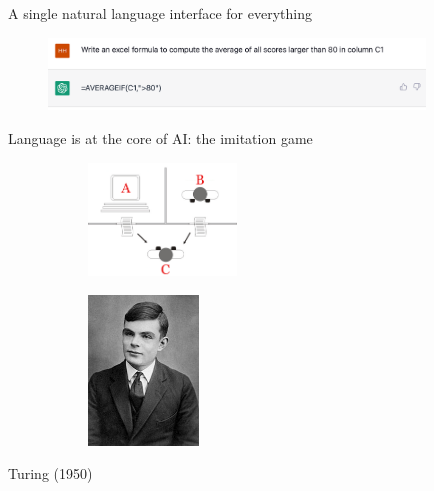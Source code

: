 \documentclass[usenames,dvipsnames,notes,11pt,aspectratio=169]{beamer}
\newcommand{\pdfnote}[1]{}
\begin{document}
\begin{frame}
    {A single natural language interface for everything}
    \begin{figure}
        \includegraphics[width=10cm]{figures/chatgpt-2}
    \end{figure}
\end{frame}

\begin{frame}
    {Language is at the core of AI: the imitation game}
    \begin{figure}
        \begin{subfigure}[b]{0.4\textwidth}
        \includegraphics[height=3cm]{figures/turing-test}
        \end{subfigure}\hfill
        \begin{subfigure}[b]{0.4\textwidth}
        \includegraphics[height=4cm]{figures/turing}
        \end{subfigure}
    \end{figure}
    \pdfnote{The interrogator chats with two agents and must tell which is human vs AI.}

     Turing (1950)
    \pdfnote{Alan Turing proposed the famous Turing test as a criteria for intelligence, where an interrogator tries to distinguish between a computer and a real human through text-based conversation. Turing was optimistic that a machine will pass the Turing test by the end of the century and possess human thinking capability. We are obviously far from that. But a more interesting question is, even if a machine passes the Turing test, does it mean it has acquired human intelligence?}


\end{frame}
\end{document}
